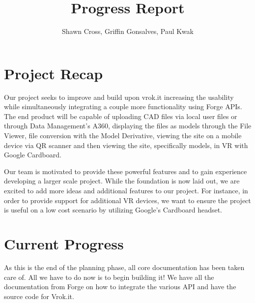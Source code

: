 \documentclass[10pt,draftclsnofoot,onecolumn]{IEEEtran}
\begin{document}
\title{Progress Report}
\author{Shawn Cross, Griffin Gonsalves, Paul Kwak}
\maketitle
\hspace*{\fill}\hspace*{\fill}
\vspace{2cm}
\begin{abstract}

\end{abstract}
\IEEEpeerreviewmaketitle

\newpage
{}

\section{Project Recap}
Our project seeks to improve and build upon vrok.it increasing the usability while simultaneously integrating a couple more functionality using Forge APIs. The end product will be capable of uploading CAD files via local user files or through Data Management’s A360, displaying the files as models through the File Viewer, file conversion with the Model Derivative, viewing the site on a mobile device via QR scanner and then viewing the site, specifically models, in VR with Google Cardboard.

Our team is motivated to provide these powerful features and to gain experience developing a larger scale project. While the foundation is now laid out, we are excited to add more ideas and additional features to our project. For instance, in order to provide support for additional VR devices, we want to ensure the project is useful on a low cost scenario by utilizing Google's Cardboard headset.

\section{Current Progress}
As this is the end of the planning phase, all core documentation has been taken care of. All we have to do now is to begin building it! We have all the documentation from Forge on how to integrate the various API and have the source code for Vrok.it.
\end{document}
